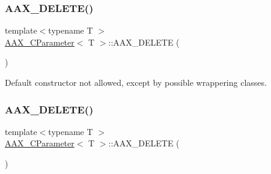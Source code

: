 \mbox{\label{a01537_a1d2644a9817d469b788596529842f58d}} 
\subsubsection{\texorpdfstring{AAX\_DELETE()}{AAX\_DELETE()}\hspace{0.1cm}{\footnotesize\ttfamily [1/3]}}
{\footnotesize\ttfamily template$<$typename T $>$ \\
\mbox{\hyperlink{a01537}{A\+A\+X\+\_\+\+C\+Parameter}}$<$ T $>$\+::A\+A\+X\+\_\+\+D\+E\+L\+E\+TE (\begin{DoxyParamCaption}\item[{\mbox{\hyperlink{a01537}{A\+A\+X\+\_\+\+C\+Parameter}}$<$ T $>$()}]{ }\end{DoxyParamCaption})}

Default constructor not allowed, except by possible wrappering classes. \mbox{\label{a01537_a9cac0f573154fab57b963e0e6f43d96d}} 
\subsubsection{\texorpdfstring{AAX\_DELETE()}{AAX\_DELETE()}\hspace{0.1cm}{\footnotesize\ttfamily [2/3]}}
{\footnotesize\ttfamily template$<$typename T $>$ \\
\mbox{\hyperlink{a01537}{A\+A\+X\+\_\+\+C\+Parameter}}$<$ T $>$\+::A\+A\+X\+\_\+\+D\+E\+L\+E\+TE (\begin{DoxyParamCaption}\item[{\mbox{\hyperlink{a01537}{A\+A\+X\+\_\+\+C\+Parameter}}$<$ T $>$(const \mbox{\hyperlink{a01537}{A\+A\+X\+\_\+\+C\+Parameter}}$<$ T $>$ \&other)}]{ }\end{DoxyParamCaption})}

\mbox{\label{a01537_ad52217842fab274984e0e5edd8344f3a}} 
